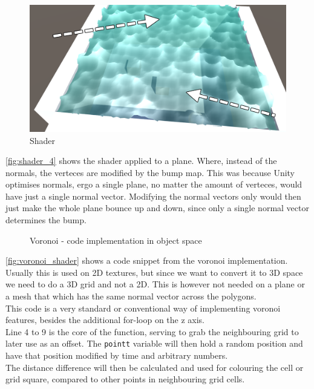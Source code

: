 \documentclass{article}
\begin{document}
\begin{figure}[H]
    \centering
    \includegraphics[width=\textwidth]{img/shader_4}
    \caption{Shader}
    \label{fig:shader_4}
\end{figure}
\autoref{fig:shader_4} shows the shader applied to a plane. Where, instead of the normals, the verteces are modified by the bump map. This was because Unity optimises normals, ergo a single plane, no matter the amount of verteces, would have just a single normal vector. Modifying the normal vectors only would then just make the whole plane bounce up and down, since only a single normal vector determines the bump.

\begin{figure}[H]
    \centering
    
    \caption{Voronoi - code implementation in object space}
    \label{fig:voronoi_shader}
\end{figure}
\autoref{fig:voronoi_shader} shows a code snippet from the voronoi implementation. Usually this is used on 2D textures, but since we want to convert it to 3D space we need to do a 3D grid and not a 2D. This is however not needed on a plane or a mesh that which has the same normal vector across the polygons.\\
This code is a very standard or conventional way of implementing voronoi features, besides the additional for-loop on the z axis.\\

Line 4 to 9 is the core of the function, serving to grab the neighbouring grid to later use as an offset. The \texttt{pointt} variable will then hold a random position and have that position modified by time and arbitrary numbers.\\The distance difference will then be calculated and used for colouring the cell or grid square, compared to other points in neighbouring grid cells.
\end{document}
